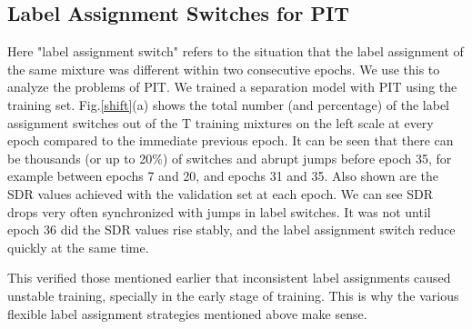 \documentclass{article}
\begin{document}
\subsection{Label Assignment Switches for PIT}
\vspace{-7pt}
Here "label assignment switch" refers to the situation that the label assignment of the same mixture was different within two consecutive epochs. We use this to analyze the problems of PIT. We trained a separation model with PIT using the training set. Fig.\ref{shift}(a) shows the total number (and percentage) of the label assignment switches out of the T training mixtures on the left scale at every epoch compared to the immediate previous epoch. It can be seen that there can be thousands (or up to 20\%) of switches and abrupt jumps before epoch 35, for example between epochs 7 and 20, and epochs 31 and 35. Also shown are the SDR values achieved with the validation set at each epoch. We can see SDR drops very often synchronized with jumps in label switches. It was not until epoch 36 did the SDR values rise stably, and the label assignment switch reduce quickly at the same time.

This verified those mentioned earlier that inconsistent label assignments caused unstable training, specially in the early stage of training. This is why the various flexible label assignment strategies mentioned above make sense. 
\end{document}
